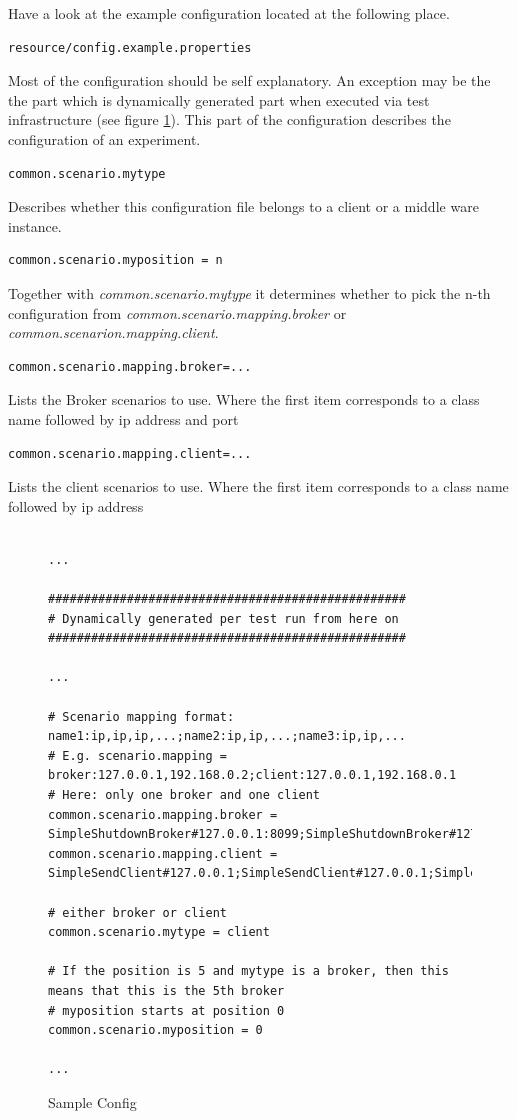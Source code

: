 \documentclass[a4paper]{article}
\begin{document}
Have a look at the example configuration located at the following place.

\begin{verbatim} 
resource/config.example.properties
\end{verbatim}

Most of the configuration should be self explanatory. An exception may be the the part which is dynamically generated part when executed via test infrastructure (see figure \ref{fig:SampleConfig}). This part of the configuration describes the configuration of an experiment.

\begin{verbatim} 
common.scenario.mytype
\end{verbatim}
Describes whether this configuration file belongs to a client or a middle ware instance.

\begin{verbatim} 
common.scenario.myposition = n
\end{verbatim}
Together with \textit{common.scenario.mytype} it determines whether to pick the n-th configuration from\textit{ common.scenario.mapping.broker} or \textit{common.scenarion.mapping.client}.

\begin{verbatim} 
common.scenario.mapping.broker=...
\end{verbatim}
Lists the Broker scenarios to use. Where the first item corresponds to a class name followed by ip address and port

\begin{verbatim} 
common.scenario.mapping.client=...
\end{verbatim}
Lists the client scenarios to use. Where the first item corresponds to a class name followed by ip address

\begin{figure}
\begin{verbatim} 

...

##################################################
# Dynamically generated per test run from here on
##################################################

...

# Scenario mapping format: name1:ip,ip,ip,...;name2:ip,ip,...;name3:ip,ip,...
# E.g. scenario.mapping = broker:127.0.0.1,192.168.0.2;client:127.0.0.1,192.168.0.1
# Here: only one broker and one client
common.scenario.mapping.broker = SimpleShutdownBroker#127.0.0.1:8099;SimpleShutdownBroker#127.0.0.1:8100,127.0.0.1:8101
common.scenario.mapping.client = SimpleSendClient#127.0.0.1;SimpleSendClient#127.0.0.1;SimpleSendClient#127.0.0.1;SimpleSendClient#127.0.0.1,127.0.0.1

# either broker or client
common.scenario.mytype = client

# If the position is 5 and mytype is a broker, then this means that this is the 5th broker
# myposition starts at position 0
common.scenario.myposition = 0

...

\end{verbatim}
\caption{Sample Config}
\label{fig:SampleConfig}
\end{figure}  	
\end{document}
